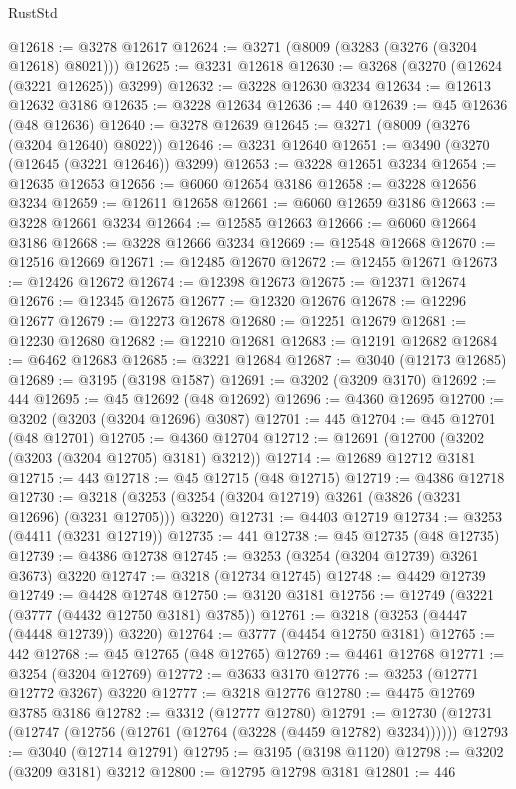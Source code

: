 \begin{lexlean}{RustStd}
\begin{coremodule}
{\begin{coremodule}
{{{{{{{{{{{{{{{{{{{{{{{{{{{{{{{{{{{{{@12618 := @3278 @12617
@12624 := @3271 (@8009 (@3283 (@3276 (@3204 @12618) @8021)))
@12625 := @3231 @12618
@12630 := @3268 (@3270 (@12624 (@3221 @12625)) @3299)
@12632 := @3228 @12630 @3234
@12634 := @12613 @12632 @3186
@12635 := @3228 @12634
@12636 := 440
@12639 := @45 @12636 (@48 @12636)
@12640 := @3278 @12639
@12645 := @3271 (@8009 (@3276 (@3204 @12640) @8022))
@12646 := @3231 @12640
@12651 := @3490 (@3270 (@12645 (@3221 @12646)) @3299)
@12653 := @3228 @12651 @3234
@12654 := @12635 @12653
@12656 := @6060 @12654 @3186
@12658 := @3228 @12656 @3234
@12659 := @12611 @12658
@12661 := @6060 @12659 @3186
@12663 := @3228 @12661 @3234
@12664 := @12585 @12663
@12666 := @6060 @12664 @3186
@12668 := @3228 @12666 @3234
@12669 := @12548 @12668
@12670 := @12516 @12669
@12671 := @12485 @12670
@12672 := @12455 @12671
@12673 := @12426 @12672
@12674 := @12398 @12673
@12675 := @12371 @12674
@12676 := @12345 @12675
@12677 := @12320 @12676
@12678 := @12296 @12677
@12679 := @12273 @12678
@12680 := @12251 @12679
@12681 := @12230 @12680
@12682 := @12210 @12681
@12683 := @12191 @12682
@12684 := @6462 @12683
@12685 := @3221 @12684
@12687 := @3040 (@12173 @12685)
@12689 := @3195 (@3198 @1587)
@12691 := @3202 (@3209 @3170)
@12692 := 444
@12695 := @45 @12692 (@48 @12692)
@12696 := @4360 @12695
@12700 := @3202 (@3203 (@3204 @12696) @3087)
@12701 := 445
@12704 := @45 @12701 (@48 @12701)
@12705 := @4360 @12704
@12712 := @12691 (@12700 (@3202 (@3203 (@3204 @12705) @3181) @3212))
@12714 := @12689 @12712 @3181
@12715 := 443
@12718 := @45 @12715 (@48 @12715)
@12719 := @4386 @12718
@12730 := @3218 (@3253 (@3254 (@3204 @12719) @3261 (@3826 (@3231 @12696) (@3231 @12705))) @3220)
@12731 := @4403 @12719
@12734 := @3253 (@4411 (@3231 @12719))
@12735 := 441
@12738 := @45 @12735 (@48 @12735)
@12739 := @4386 @12738
@12745 := @3253 (@3254 (@3204 @12739) @3261 @3673) @3220
@12747 := @3218 (@12734 @12745)
@12748 := @4429 @12739
@12749 := @4428 @12748
@12750 := @3120 @3181
@12756 := @12749 (@3221 (@3777 (@4432 @12750 @3181) @3785))
@12761 := @3218 (@3253 (@4447 (@4448 @12739)) @3220)
@12764 := @3777 (@4454 @12750 @3181)
@12765 := 442
@12768 := @45 @12765 (@48 @12765)
@12769 := @4461 @12768
@12771 := @3254 (@3204 @12769)
@12772 := @3633 @3170
@12776 := @3253 (@12771 @12772 @3267) @3220
@12777 := @3218 @12776
@12780 := @4475 @12769 @3785 @3186
@12782 := @3312 (@12777 @12780)
@12791 := @12730 (@12731 (@12747 (@12756 (@12761 (@12764 (@3228 (@4459 @12782) @3234))))))
@12793 := @3040 (@12714 @12791)
@12795 := @3195 (@3198 @1120)
@12798 := @3202 (@3209 @3181) @3212
@12800 := @12795 @12798 @3181
@12801 := 446
}}}}}}}}}}}}}}}}}}}}}}}}}}}}}}}}}}}}}
\end{coremodule}}
\end{coremodule}
\end{lexlean}
